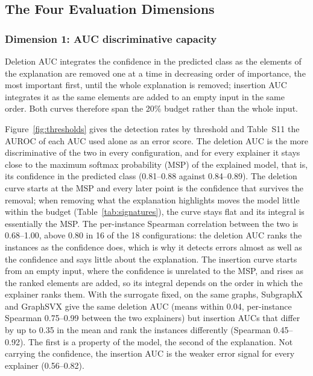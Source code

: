 \documentclass[preprint, times, review, 10pt]{elsarticle}
\begin{document}
\subsection{The Four Evaluation Dimensions} \label{sec:dim1} \label{sec:dim2} \label{sec:dim3} \label{sec:dim4}

\subsubsection{Dimension 1: AUC discriminative capacity}

Deletion AUC integrates the confidence in the predicted class as the elements of the explanation are removed one at a time in decreasing order of importance, the most important first, until the whole explanation is removed; insertion AUC integrates it as the same elements are added to an empty input in the same order. Both curves therefore span the 20\% budget rather than the whole input.

Figure~\ref{fig:thresholds} gives the detection rates by threshold and Table~S11 the AUROC of each AUC used alone as an error score. The deletion AUC is the more discriminative of the two in every configuration, and for every explainer it stays close to the maximum softmax probability (MSP) of the explained model, that is, its confidence in the predicted class (0.81--0.88 against 0.84--0.89). The deletion curve starts at the MSP and every later point is the confidence that survives the removal; when removing what the explanation highlights moves the model little within the budget (Table~\ref{tab:signatures}), the curve stays flat and its integral is essentially the MSP. The per-instance Spearman correlation between the two is 0.68--1.00, above 0.80 in 16 of the 18 configurations: the deletion AUC ranks the instances as the confidence does, which is why it detects errors almost as well as the confidence and says little about the explanation. The insertion curve starts from an empty input, where the confidence is unrelated to the MSP, and rises as the ranked elements are added, so its integral depends on the order in which the explainer ranks them. With the surrogate fixed, on the same graphs, SubgraphX and GraphSVX give the same deletion AUC (means within 0.04, per-instance Spearman 0.75--0.99 between the two explainers) but insertion AUCs that differ by up to 0.35 in the mean and rank the instances differently (Spearman 0.45--0.92). The first is a property of the model, the second of the explanation. Not carrying the confidence, the insertion AUC is the weaker error signal for every explainer (0.56--0.82).
\end{document}
